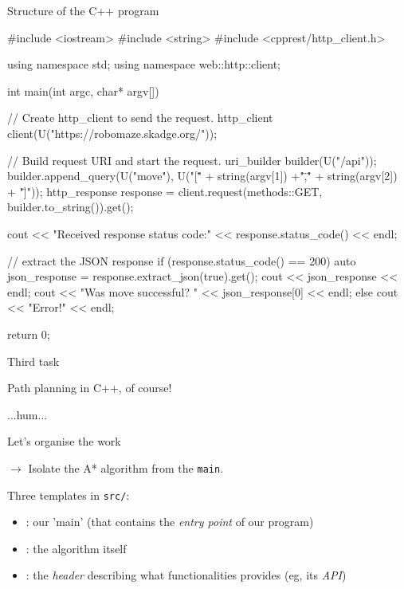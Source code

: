 \documentclass[compress]{beamer}
\begin{document}
\begin{frame}[fragile]{Structure of the C++ program}


\begin{cppcode}
#include <iostream>
#include <string>
#include <cpprest/http_client.h>

using namespace std;
using namespace web::http::client;

int main(int argc, char* argv[])
{
    // Create http_client to send the request.
    http_client client(U("https://robomaze.skadge.org/"));

    // Build request URI and start the request.
    uri_builder builder(U("/api"));
    builder.append_query(U("move"), U("[\"" + string(argv[1]) +"\",\"" + string(argv[2]) + "\"]"));
    http_response response = client.request(methods::GET, builder.to_string()).get();

    cout << "Received response status code:" << response.status_code() << endl;

    // extract the JSON response
    if (response.status_code() == 200) {
        auto json_response = response.extract_json(true).get();
        cout << json_response << endl;
        cout << "Was move successful? " << json_response[0] << endl;
    }
    else {
        cout << "Error!" << endl;
    }

    return 0;
}
\end{cppcode}

\end{frame}

\begin{frame}[fragile]{Third task}

Path planning in C++, of course!

    \vspace{10em}

    \small ...hum...

\end{frame}

\begin{frame}{Let's organise the work}


    $\rightarrow$ Isolate the A* algorithm from the \texttt{main}.

    Three templates in \texttt{src/}:

    \begin{itemize}
        \item<+-> : our 'main' (that contains the \emph{entry
            point} of our program) 
        \item<+-> : the algorithm itself
        \item<+-> : the \emph{header} describing what functionalities
             provides (eg, its \emph{API})

    \end{itemize}

\end{frame}
\end{document}
